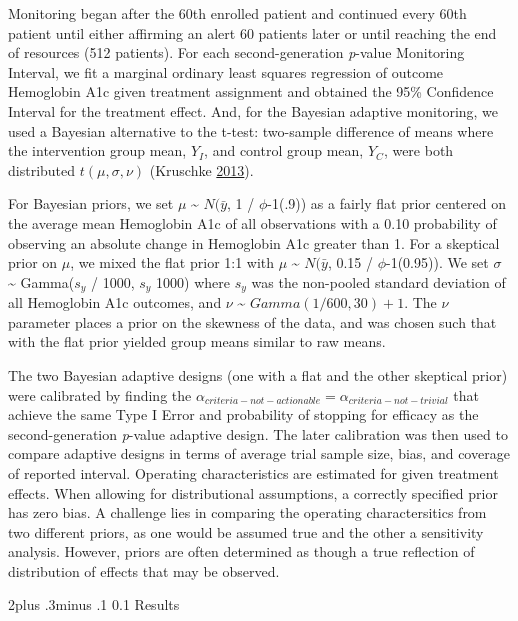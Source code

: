 \documentclass[12pt,oneside]{book}
\makeatletter
\newlength{\li}\setlength{\li}{14.48pt}
\newlength{\di}\setlength{\di}{-3.5mm}
\renewcommand\subsection{\@startsection {subsection}{2}{\z@}%
    {2\@bls  plus .3\@bls minus .1\@bls}%
    {0.1\@bls}%
    {\noindent\normalfont}}
\theoremstyle{definition}
\theoremstyle{definition}
\theoremstyle{definition}
\theoremstyle{remark}
\makeatother
\begin{document}
Monitoring began after the 60th enrolled patient and continued every
60th patient until either affirming an alert 60 patients later or until
reaching the end of resources (512 patients). For each second-generation
\emph{p}-value Monitoring Interval, we fit a marginal ordinary least
squares regression of outcome Hemoglobin A1c given treatment assignment
and obtained the 95\% Confidence Interval for the treatment effect. And,
for the Bayesian adaptive monitoring, we used a Bayesian alternative to
the t-test: two-sample difference of means where the intervention group
mean, \(Y_I\), and control group mean, \(Y_C\), were both distributed
\(t(\mu, \sigma, \nu)\) (Kruschke
\protect\hyperlink{ref-Kruschke:2013jy}{2013}).

For Bayesian priors, we set \(\mu\) \textasciitilde{} \(N(\bar{y}\), 1 /
\(\phi\)-1(.9)) as a fairly flat prior centered on the average mean
Hemoglobin A1c of all observations with a 0.10 probability of observing
an absolute change in Hemoglobin A1c greater than 1. For a skeptical
prior on \(\mu\), we mixed the flat prior 1:1 with \(\mu\)
\textasciitilde{} \(N(\bar{y}\), 0.15 / \(\phi\)-1(0.95)). We set
\(\sigma\) \textasciitilde{} Gamma(\(s_y\) / 1000, \(s_y\) 1000) where
\(s_y\) was the non-pooled standard deviation of all Hemoglobin A1c
outcomes, and \(\nu\) \textasciitilde{} \(Gamma(1 / 600, 30) + 1\). The
\(\nu\) parameter places a prior on the skewness of the data, and was
chosen such that with the flat prior yielded group means similar to raw
means.

The two Bayesian adaptive designs (one with a flat and the other
skeptical prior) were calibrated by finding the
\(\alpha_{criteria-not-actionable} = \alpha_{criteria-not-trivial}\)
that achieve the same Type I Error and probability of stopping for
efficacy as the second-generation \emph{p}-value adaptive design. The
later calibration was then used to compare adaptive designs in terms of
average trial sample size, bias, and coverage of reported interval.
Operating characteristics are estimated for given treatment effects.
When allowing for distributional assumptions, a correctly specified
prior has zero bias. A challenge lies in comparing the operating
charactersitics from two different priors, as one would be assumed true
and the other a sensitivity analysis. However, priors are often
determined as though a true reflection of distribution of effects that
may be observed.

\hypertarget{results}{%
\subsection{Results}\label{results}}
\end{document}
